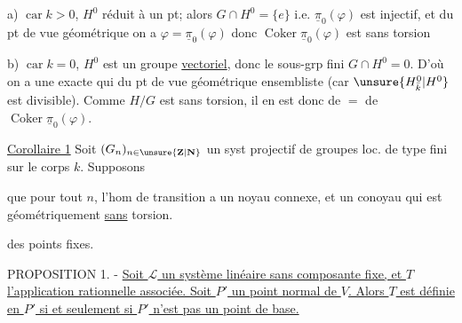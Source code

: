 

a) $\operatorname{car}k>0$,   $H^0$  réduit à un pt; alors $G\cap H^0=\{e\}$ i.e. $\underline{\pi}_0(\varphi)$ est injectif, et du pt de vue géométrique  on a $\varphi=\underline{\pi}_0(\varphi)$ donc $\operatorname{Coker}\underline{\pi}_0(\varphi)$ est sans torsion

b) $\operatorname{car}k=0$, $H^0$ est un groupe \uline{vectoriel},  donc le sous-grp fini $G\cap H^0=0$.
D'où  on a une  exacte
qui  du pt de vue géométrique ensembliste (car $\unsure{H^0_{\bar{k}}|H^0}$ est divisible). Comme $H/G$ est sans torsion, il en est donc de $=$ de $\operatorname{Coker}\underline{\pi}_0(\varphi)$.

\uline{Corollaire 1} Soit $(G_n)_{n\in\unsure{\mathbf{Z}|\mathbf{N}}}$ un syst projectif de groupes  loc. de type fini sur le corps $k$. Supposons


 que pour tout $n$, l'hom de transition
 a un noyau connexe, et un conoyau qui est géométriquement \uline{sans} torsion.




des points fixes.

PROPOSITION 1. - \uline{Soit $\mathcal{L}$ un système linéaire sans composante fixe, et $T$ l'application rationnelle associée. Soit $P'$ un point normal de $V$. Alors $T$ est définie en $P'$ si et seulement si $P'$ n'est pas un point de base.}

